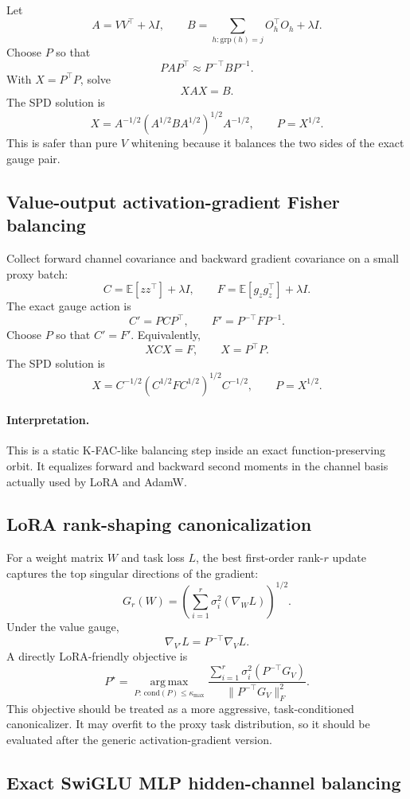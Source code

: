\documentclass[11pt]{article}
\newcommand{\E}{\mathbb{E}}
\newcommand{\cond}{\mathrm{cond}}
\newcommand{\argmax}{\operatorname*{arg\,max}}
\newcommand{\grp}{\mathrm{grp}}
\begin{document}
Let
\[
    A=VV^\top+\lambda I,
    \qquad
    B=\sum_{h:\grp(h)=j}O_h^\top O_h+\lambda I.
\]
Choose $P$ so that
\[
    PAP^\top\approx P^{-\top}BP^{-1}.
\]
With $X=P^\top P$, solve
\[
    XAX=B.
\]
The SPD solution is
\[
    X=A^{-1/2}(A^{1/2}BA^{1/2})^{1/2}A^{-1/2},
    \qquad
    P=X^{1/2}.
\]
This is safer than pure $V$ whitening because it balances the two sides of the exact gauge pair.

\subsection{Value-output activation-gradient Fisher balancing}

Collect forward channel covariance and backward gradient covariance on a small proxy batch:
\[
    C=\E[zz^\top]+\lambda I,
    \qquad
    F=\E[g_zg_z^\top]+\lambda I.
\]
The exact gauge action is
\[
    C'=PCP^\top,
    \qquad
    F'=P^{-\top}FP^{-1}.
\]
Choose $P$ so that $C'=F'$. Equivalently,
\[
    XCX=F,
    \qquad X=P^\top P.
\]
The SPD solution is
\[
    X=C^{-1/2}(C^{1/2}FC^{1/2})^{1/2}C^{-1/2},
    \qquad
    P=X^{1/2}.
\]

\paragraph{Interpretation.}
This is a static K-FAC-like balancing step inside an exact function-preserving orbit. It equalizes forward and backward second moments in the channel basis actually used by LoRA and AdamW.

\subsection{LoRA rank-shaping canonicalization}

For a weight matrix $W$ and task loss $L$, the best first-order rank-$r$ update captures the top singular directions of the gradient:
\[
    G_r(W)=\left(\sum_{i=1}^r\sigma_i^2(\nabla_WL)\right)^{1/2}.
\]
Under the value gauge,
\[
    \nabla_{V'}L=P^{-\top}\nabla_VL.
\]
A directly LoRA-friendly objective is
\[
    P^\star
    =
    \argmax_{P:\,\cond(P)\le \kappa_{\max}}
    \frac{\sum_{i=1}^{r}\sigma_i^2(P^{-\top}G_V)}{\|P^{-\top}G_V\|_F^2}.
\]
This objective should be treated as a more aggressive, task-conditioned canonicalizer. It may overfit to the proxy task distribution, so it should be evaluated after the generic activation-gradient version.

\subsection{Exact SwiGLU MLP hidden-channel balancing}
\end{document}
